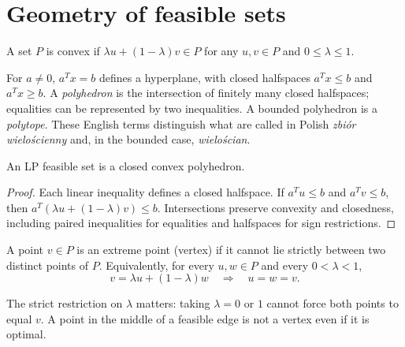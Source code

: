 \documentclass[11pt,a4paper]{article}
\begin{document}
\section{Geometry of feasible sets}\label{sec:geometry}
\begin{definition}[Convexity]
  A set $P$ is convex if $\lambda u+(1-\lambda)v\in P$ for any $u,v\in P$ and
  $0\leq\lambda\leq1$.
\end{definition}
For $a\neq0$, $a^Tx=b$ defines a hyperplane, with closed halfspaces
$a^Tx\leq b$ and $a^Tx\geq b$. A \emph{polyhedron} is the intersection of finitely
many closed halfspaces; equalities can be represented by two inequalities.
A bounded polyhedron is a \emph{polytope}. These English terms distinguish what
are called in Polish \emph{zbi\'or wielo\'scienny} and, in the bounded case,
\emph{wielo\'scian}.

\begin{proposition}
  An LP feasible set is a closed convex polyhedron.
\end{proposition}
\begin{proof}
  Each linear inequality defines a closed halfspace. If $a^Tu\leq b$ and
  $a^Tv\leq b$, then $a^T(\lambda u+(1-\lambda)v)\leq b$.
  Intersections preserve convexity and closedness, including paired inequalities
  for equalities and halfspaces for sign restrictions.
\end{proof}

\begin{definition}\label{def:vertex}
  A point $v\in P$ is an extreme point (vertex) if it cannot lie strictly
  between two distinct points of $P$. Equivalently, for every $u,w\in P$
  and every $0<\lambda<1$,
  \[
    v=\lambda u+(1-\lambda)w\quad\Longrightarrow\quad u=w=v.
  \]
\end{definition}
The strict restriction on $\lambda$ matters: taking $\lambda=0$ or $1$ cannot
force both points to equal $v$. A point in the middle of a feasible edge is not
a vertex even if it is optimal.
\end{document}
